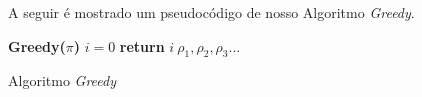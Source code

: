 A seguir é mostrado um pseudocódigo de nosso Algoritmo \textit{Greedy}.


\begin{algorithm}[H]
\label{Algoritmo Greedy}
\SetAlgoLined
\textbf{Greedy($\pi$)}\;
 $i = 0$\;
 \textbf{return} $i \  \rho_1, \rho_2, \rho_3 ...$\;
 \caption{Algoritmo \textit{Greedy}}
\end{algorithm}





